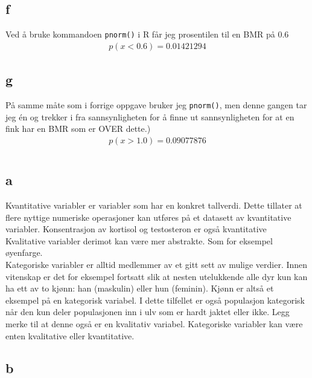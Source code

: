 \subsection*{f}

Ved å bruke kommandoen \texttt{pnorm()} i R får jeg prosentilen til en BMR på $0.6$
\begin{align*}
    p(x<0.6) = 0.01421294
\end{align*}

\subsection*{g}
På samme måte som i forrige oppgave bruker jeg \texttt{pnorm()}, men denne gangen tar jeg én og trekker i fra sannsynligheten for å finne ut sannsynligheten for at en fink har en BMR som er OVER dette.)
\begin{align*}
    p(x>1.0) = 0.09077876
\end{align*}

\pagebreak
\section{}


\subsection*{a}
Kvantitative variabler er variabler som har en konkret tallverdi. Dette tillater at flere nyttige numeriske operasjoner kan utføres på et datasett av kvantitative variabler. Konsentrasjon av kortisol og testosteron er også kvantitative\\
Kvalitative variabler derimot kan være mer abstrakte. Som for eksempel øyenfarge.\\
Kategoriske variabler er alltid medlemmer av et gitt sett av mulige verdier. Innen vitenskap er det for eksempel fortsatt slik at nesten utelukkende alle dyr kun kan ha ett av to kjønn: han (maskulin) eller hun (feminin). Kjønn er altså et eksempel på en kategorisk variabel. I dette tilfellet er også populasjon kategorisk når den kun deler populasjonen inn i ulv som er hardt jaktet eller ikke. Legg merke til at denne også er en kvalitativ variabel. Kategoriske variabler kan være enten kvalitative eller kvantitative.

\subsection*{b}

